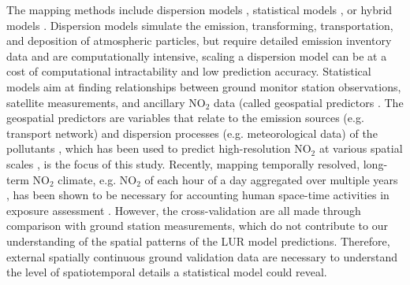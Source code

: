 \documentclass{article}
\begin{document}
The mapping methods include dispersion models \citep{holmes2006review,health2010traffic}, statistical models \citep{chen2019comparison}, or hybrid models \citep{molter2010modelling,marshall2008within,beelen2010comparison,dijkema2010comparison, akita2014large}. Dispersion models simulate the emission, transforming, transportation, and deposition of atmospheric particles, but require detailed emission inventory data and are computationally intensive, scaling a dispersion model can be at a cost of computational intractability and low prediction accuracy. Statistical models aim at finding relationships between ground monitor station observations, satellite measurements, and ancillary NO$_2$ data (called geospatial predictors \citep{rivera2013nitrogen, park2017individual,kharol2015assessment, isiugo2018assessing, chen2019comparison,luglobal}. The geospatial predictors are variables that relate to the emission sources (e.g. transport network) and dispersion processes (e.g. meteorological data) of the pollutants \citep{briggs2000regression}, which has been used to predict high-resolution NO$_2$ at various spatial scales \citep{Hoek2008,larkin2017global}, is the focus of this study.  Recently, mapping temporally resolved, long-term NO$_2$ climate, e.g. NO$_2$ of each hour of a day aggregated over multiple years \citep{lu2020land}, has been shown to be necessary for accounting human space-time activities in exposure assessment \citep{lu2019}. However, the cross-validation are all made through comparison with ground station measurements, which do not contribute to our understanding of the spatial patterns of the LUR model predictions. Therefore, external spatially continuous ground validation data are necessary to understand the level of spatiotemporal details a statistical model could reveal. 
\end{document}
